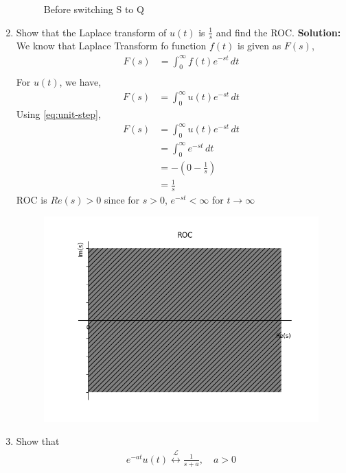 \documentclass[journal,12pt,twocolumn]{IEEEtran}
\newcommand{\solution}{\noindent \textbf{Solution: }}
\providecommand{\brak}[1]{\ensuremath{\left(#1\right)}}
\providecommand{\system}[1]{\overset{\mathcal{#1}}{ \longleftrightarrow}}
\numberwithin{equation}{section}
\renewcommand\thesection{\arabic{section}}
\begin{document}
\begin{enumerate}[label=\arabic*.,ref=\thesection.\theenumi]
		\begin{figure}
			
			\caption{Before switching S to Q}
		\end{figure}
		
		\item Show that the Laplace transform of $u(t)$ is $\frac{1}{s}$ and find the ROC.
		\solution We know that Laplace Transform fo function $f(t)$ is given as $F(s)$,
		\begin{align}
			\label{eq:LaplaceTrans}
			F(s)&= \int_{0}^{\infty} f(t)e^{-st} \,dt \\
		\end{align}
		For $u(t)$, we have,
		\begin{align}
			F(s)&=\int_{0}^{\infty} u(t)e^{-st} \,dt
		\end{align}
		Using \eqref{eq:unit-step},
		\begin{align}
			F(s)&=\int_{0}^{\infty} u(t)e^{-st} \,dt\\
			&=\int_{0}^{\infty} e^{-st} \,dt\\
			&=-\brak{0-\frac{1}{s}}\\
			&=\frac{1}{s}
		\end{align}
		ROC is $ Re(s)>0$ since for $s>0$, $e^{-st}<\infty$ for $t \to \infty$
		\begin{figure}[!ht]
			\centering
			\includegraphics[width=\columnwidth]{figs/2_4.png}
			\caption{}
			\label{fig:roc1}
		\end{figure}
		\item Show that 
		\begin{align}
			e^{-at}u(t) \system{L} \frac{1}{s+a}, \quad a > 0

\end{align}
\end{enumerate}
\end{document}
